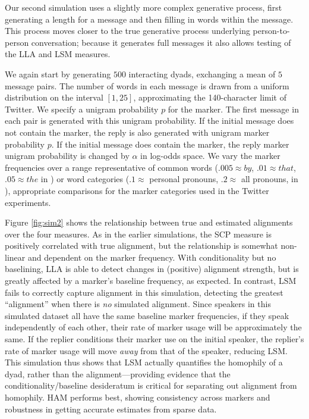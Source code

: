 \documentclass{acm_proc_article-sp}
\begin{document}
Our second simulation uses a slightly more complex generative process, first generating a length for a message and then filling in words within the message. This process moves closer to the true generative process underlying person-to-person conversation; because it generates full messages it also allows testing of the LLA and LSM measures.

We again start by generating $500$ interacting dyads, exchanging a mean of $5$ message pairs. The number of words in each message is drawn from a uniform distribution on the interval $[1,25]$, approximating the 140-character limit of Twitter. We specify a unigram probability $p$ for the marker. The first message in each pair is generated with this unigram probability.  If the initial message does not contain the marker, the reply is also generated with unigram marker probability $p$. If the initial message does contain the marker, the reply marker unigram probability is changed by $\alpha$ in log-odds space.  We vary the marker frequencies over a range representative of common words ($.005 \approx by$, $.01 \approx that$, $.05 \approx the$ in \cite{Brown}) or word categories ($.1 \approx $ personal pronouns, $.2 \approx $ all pronouns, in \cite{KacewiczEtAl2013}), appropriate comparisons for the marker categories used in the Twitter experiments.

Figure \ref{fig:sim2} shows the relationship between true and estimated alignments over the four measures. As in the earlier simulations, the SCP measure is positively correlated with true alignment, but the relationship is somewhat non-linear and dependent on the marker frequency.  With conditionality but no baselining, LLA is able to detect changes in (positive) alignment strength, but is greatly affected by a marker's baseline frequency, as expected. In contrast, LSM fails to correctly capture alignment in this simulation, detecting the greatest ``alignment'' when there is \emph{no} simulated alignment. Since speakers in this simulated dataset all have the same baseline marker frequencies, if they speak independently of each other, their rate of marker usage will be approximately the same. If the replier conditions their marker use on the initial speaker, the replier's rate of marker usage will move \emph{away} from that of the speaker, reducing LSM.  This simulation thus shows that LSM actually quantifies the homophily of a dyad, rather than the alignment---providing evidence that the conditionality/baseline desideratum is critical for separating out alignment from homophily. HAM performs best, showing consistency across markers and robustness in getting accurate estimates from sparse data. 
\end{document}

